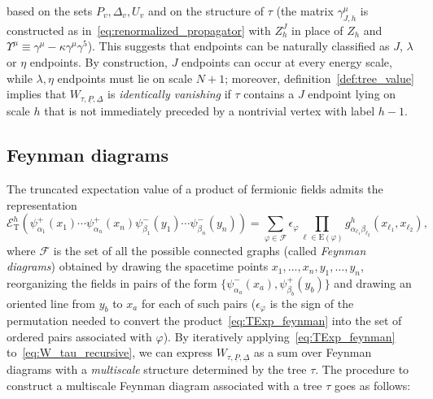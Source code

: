 \documentclass[a4paper, 11pt]{article}
\newcommand{\sing}[2]{{#1}^{#2}}							%
\renewcommand{\phi}{\varphi}								%
\newcommand{\edg}{\mathrm{E}}								%
\newcommand{\TExp}[1]{\mathcal{E}^{#1}_%
{\scriptscriptstyle{\mathrm{T}}}}							%
\theoremstyle{thm}
\begin{document}
based on the sets $P_v, \Delta_v, U_v$ and on the structure of $\tau$ (the matrix $\gamma^\mu_{J, h}$ is constructed as in~\eqref{eq:renormalized_propagator} with $Z^J_h$ in place of $Z_h$ and $\Upsilon^\mu \equiv \gamma^\mu - \kappa \gamma^\mu\gamma^5$). This suggests that endpoints can be naturally classified as $J$, $\lambda$ or $\eta$ endpoints. By construction, $J$ endpoints can occur at every energy scale, while $\lambda, \eta$ endpoints must lie on scale $N+1$; moreover, definition~\ref{def:tree_value} implies that $W_{\tau, \underline{P}, \underline{\Delta}}$ is \emph{identically vanishing} if $\tau$ contains a $J$ endpoint lying on scale $h$ that is not immediately preceded by a nontrivial vertex with label $h-1$.



\subsection{Feynman diagrams}
The truncated expectation value of a product of fermionic fields admits the representation
\begin{equation}
\label{eq:TExp_feynman}
\TExp{h}(\psi^+_{\alpha_1}(x_1) \cdots \psi^+_{\alpha_n}(x_n) \psi^-_{\beta_1}(y_1) \cdots \psi^-_{\beta_n}(y_n)) = \sum_{\phi \in \mathcal{F}} \epsilon_\phi \prod_{\ell \in \edg(\phi)} \sing{g}{h}_{\alpha_{\ell_1} \beta_{\ell_2}}(x_{\ell_1}, x_{\ell_2}),
\end{equation}
where $\mathcal{F}$ is the set of all the possible connected graphs (called \emph{Feynman diagrams}) obtained by drawing the spacetime points $x_1, \dots, x_n, y_1, \dots, y_n$, reorganizing the fields in pairs of the form $\lbrace \psi^-_{\alpha_a}(x_a), \psi^+_{\beta_b}(y_b) \rbrace$ and drawing an oriented line from $y_b$ to $x_a$ for each of such pairs ($\epsilon_\phi$ is the sign of the permutation needed to convert the product~\eqref{eq:TExp_feynman} into the set of ordered pairs associated with $\phi$). By iteratively applying~\eqref{eq:TExp_feynman} to~\eqref{eq:W_tau_recursive}, we can express $W_{\tau, \underline{P}, \underline{\Delta}}$ as a sum over Feynman diagrams with a \emph{multiscale} structure determined by the tree $\tau$. The procedure to construct a multiscale Feynman diagram associated with a tree $\tau$ goes as follows:
\end{document}
